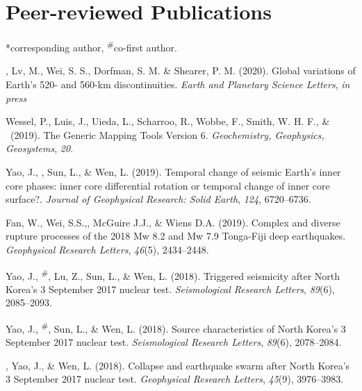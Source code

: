 \newcommand{\Revision}{\textit{under revision}}
\newcommand{\CS}{*} %
\newcommand{\CF}{\textsuperscript{\#}} %

\section*{Peer-reviewed Publications}
\CS corresponding author, \CF co-first author.

\begin{etaremune}
\item \Tian, Lv, M., Wei, S. S., Dorfman, S. M. \& Shearer, P. M. (2020).
	Global variations of Earth's 520- and 560-km discontinuities.
	\textit{Earth and Planetary Science Letters},
	\textit{in press}
\item
    Wessel, P., Luis, J., Uieda, L., Scharroo, R., Wobbe, F., Smith, W. H. F., \& \Tian\ (2019).
    The Generic Mapping Tools Version 6.
    \textit{Geochemistry, Geophysics, Geosystems}, \textit{20}.
\item
    Yao, J., \Tian, Sun, L., \& Wen, L. (2019).
    Temporal change of seismic Earth's inner core phases: inner core differential rotation or temporal change of inner core surface?.
    \textit{Journal of Geophysical Research: Solid Earth}, \textit{124}, 6720--6736.
\item
    Fan, W., Wei, S.S.,\Tian, McGuire J.J., \& Wiens D.A. (2019).
    Complex and diverse rupture processes of the 2018 Mw 8.2 and Mw 7.9 Tonga-Fiji deep earthquakes.
    \textit{Geophysical Research Letters}, \textit{46}(5), 2434--2448.
\item
    Yao, J., \Tian\CF, Lu, Z., Sun, L., \& Wen, L. (2018).
    Triggered seismicity after North Korea's 3 September 2017 nuclear test.
    \textit{Seismological Research Letters}, \textit{89}(6), 2085--2093.
\item
    Yao, J., \Tian\CF, Sun, L., \& Wen, L. (2018).
	Source characteristics of North Korea's 3 September 2017 nuclear test.
    \textit{Seismological Research Letters}, \textit{89}(6), 2078--2084.
\item
    \Tian, Yao, J., \& Wen, L. (2018).
    Collapse and earthquake swarm after North Korea's 3 September 2017 nuclear test.
    \textit{Geophysical Research Letters}, \textit{45}(9), 3976--3983.

\end{etaremune}
